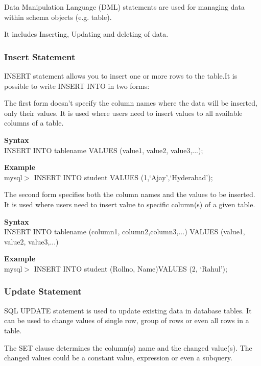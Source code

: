 \documentclass[11pt,a4paper]{article}
\begin{document}
\vspace{5in}


Data Manipulation Language (DML) statements are used for managing data within schema objects (e.g. table).\newline

It includes Inserting, Updating and deleting of data.
\subsubsection*{Insert Statement}
INSERT statement allows you to insert one or more rows to the table.It is possible to write INSERT INTO in two forms:

The first form doesn't specify the column names where the data will be inserted, only their values. It is used where users need to insert values to all available columns of a table.

\textbf{Syntax}\\
         INSERT INTO tablename VALUES (value1, value2, value3,...);

\textbf{Example}\\
mysql$>$ INSERT INTO student VALUES (1,`Ajay',`Hyderabad');

The second form specifies both the column names and the values to be inserted. It is used where users need to insert value to specific column(s) of a given table.

\textbf{Syntax}\\
         INSERT INTO tablename (column1, column2,column3,...) VALUES (value1, value2, value3,...)

\textbf{Example}\\
mysql$>$ INSERT INTO student (Rollno, Name)VALUES (2, `Rahul');

\subsubsection*{Update Statement}
SQL UPDATE statement is used to update existing data in database tables. It can be used to change values of single row, group of rows or even all rows in a table.

The SET clause determines the column(s) name and the changed value(s). The changed values could be a constant value, expression or even a subquery.
\end{document}
